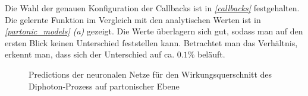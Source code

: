 Die Wahl der genauen Konfiguration der Callbacks ist in \textit{\autoref{callbacks}} festgehalten.
Die gelernte Funktion im Vergleich mit den analytischen Werten ist in \textit{\autoref{partonic_models} (a)}  gezeigt. Die Werte überlagern sich gut, sodass man auf den ersten Blick keinen Unterschied feststellen kann. Betrachtet man das Verhältnis, erkennt man, dass sich der Unterschied auf ca. $0.1\%$ beläuft. 
\begin{figure}[hbt]
	\centering
	\caption{Predictions der neuronalen Netze für den Wirkungsquerschnitt des Diphoton-Prozess auf partonischer Ebene}
	\label{partonic_models}
\end{figure}

